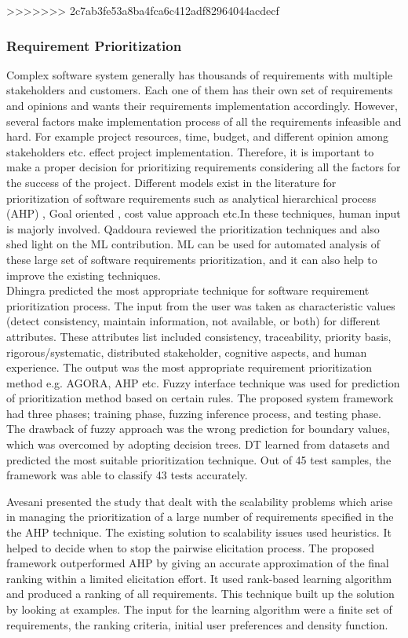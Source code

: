 >>>>>>> 2c7ab3fe53a8ba4fca6c412adf82964044acdecf
\subsubsection{Requirement Prioritization}
Complex software system generally has thousands of requirements with multiple
stakeholders and customers. Each one of them has their own set of requirements
and opinions and wants their requirements implementation accordingly. However,
several factors make implementation process of all the requirements infeasible
and hard. For example project resources, time, budget, and different opinion among
stakeholders etc. effect project implementation. Therefore, it
is important to make a proper decision for prioritizing requirements considering
all the factors for the success of the project. Different models exist in the
literature for prioritization of software requirements such as analytical
hierarchical process (AHP) \cite{saaty2008}, Goal oriented
\cite{VanLamsweerde:2001}, cost value approach \cite{Karlsson:1997} etc.In these
techniques, human input is majorly involved. Qaddoura \etal \cite{RQaddoura}
reviewed the prioritization techniques and also shed light on the ML
contribution. ML can be used for automated analysis of these large set of
software requirements prioritization, and it can also help to improve the existing techniques.\\

	Dhingra \etal  \cite{S.Dhingra} predicted the most appropriate technique for
software requirement prioritization process. The input from the user was taken as characteristic values (detect consistency, maintain information, not available, or both) for different attributes. These attributes list included consistency,
traceability, priority basis, rigorous/systematic, distributed stakeholder,
cognitive aspects, and human experience. The output was the
most appropriate requirement prioritization method e.g. AGORA, AHP etc. Fuzzy interface technique was
used for prediction of prioritization method based on certain rules. The
proposed system framework had three phases; training phase, fuzzing inference
process, and testing phase. The drawback of fuzzy approach was the wrong prediction
for boundary values, which was overcomed by adopting decision trees. DT learned from datasets and
predicted the most suitable prioritization technique. Out of 45 test samples, the
framework was able to classify 43 tests accurately.

	Avesani \etal\cite{PAvesani} presented the study that dealt with the scalability
problems which arise in managing the prioritization of a large number of
requirements specified in the the AHP technique. The existing solution to
scalability issues used heuristics. It helped to decide when to stop the pairwise
elicitation process. The proposed framework outperformed AHP by giving an
accurate approximation of the final ranking within a limited elicitation effort. It used rank-based
learning algorithm and produced a ranking of all requirements. This technique
built up the solution by looking at examples. The input for the learning
algorithm were a finite set of requirements, the ranking criteria, initial user
preferences and density function.


